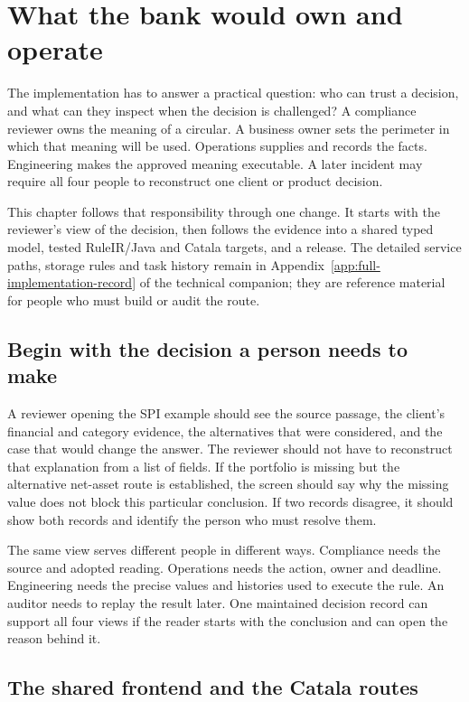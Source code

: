 \chapter{What the bank would own and operate}
\label{ch:implementation}

The implementation has to answer a practical question: who can trust a decision,
and what can they inspect when the decision is challenged? A compliance
reviewer owns the meaning of a circular. A business owner sets the perimeter in
which that meaning will be used. Operations supplies and records the facts.
Engineering makes the approved meaning executable. A later incident may require
all four people to reconstruct one client or product decision.

This chapter follows that responsibility through one change. It starts with the
reviewer's view of the decision, then follows the evidence into a shared typed
model, tested RuleIR/Java and Catala targets, and a release. The detailed service
paths, storage rules and task history remain in Appendix~\ref{app:full-implementation-record}
of the technical companion; they are reference material for people who must
build or audit the route.

\section{Begin with the decision a person needs to make}

A reviewer opening the SPI example should see the source passage, the client's
financial and category evidence, the alternatives that were considered, and the
case that would change the answer. The reviewer should not have to reconstruct
that explanation from a list of fields. If the portfolio is missing but the
alternative net-asset route is established, the screen should say why the missing
value does not block this particular conclusion. If two records disagree, it
should show both records and identify the person who must resolve them.

The same view serves different people in different ways. Compliance needs the
source and adopted reading. Operations needs the action, owner and deadline.
Engineering needs the precise values and histories used to execute the rule. An
auditor needs to replay the result later. One maintained decision record can
support all four views if the reader starts with the conclusion and can open the
reason behind it.

\section{The shared frontend and the Catala routes}
\label{sec:implementation-shared-front-end}

